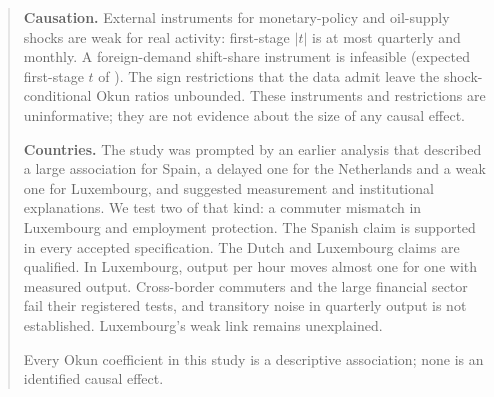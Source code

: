 \begin{abstract}
\textbf{Causation.} External instruments for monetary-policy and oil-supply shocks are weak
for real activity: first-stage $|t|$ is at most  quarterly and
 monthly. A foreign-demand shift-share instrument is infeasible (expected
first-stage $t$ of ). The sign restrictions that the data admit leave the
shock-conditional Okun ratios unbounded. These instruments and restrictions are
uninformative; they are not evidence about the size of any causal effect.

\textbf{Countries.} The study was prompted by an earlier analysis that described a large
association for Spain, a delayed one for the Netherlands and a weak one for Luxembourg,
and suggested measurement and institutional explanations. We test two of that kind: a
commuter mismatch in Luxembourg and employment protection. The Spanish
claim is supported in every accepted specification. The Dutch and Luxembourg claims are
qualified. In Luxembourg, output per hour moves almost one for one with measured output.
Cross-border commuters and the large financial sector fail their registered tests, and
transitory noise in quarterly output is not established. Luxembourg's weak link remains
unexplained.

Every Okun coefficient in this study is a descriptive association; none is an identified
causal effect.
\end{abstract}
